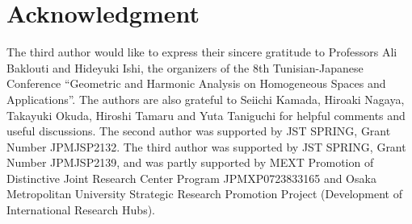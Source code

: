 \documentclass[dvipdfmx,12pt]{amsart}
\theoremstyle{plain}
\theoremstyle{definition}
\begin{document}
\section*{Acknowledgment}
The third author would like to express their sincere gratitude to Professors Ali Baklouti and Hideyuki Ishi, the organizers of the 8th Tunisian-Japanese Conference “Geometric and Harmonic Analysis on Homogeneous Spaces and Applications”.
The authors are also grateful
to Seiichi Kamada, Hiroaki Nagaya, Takayuki Okuda, Hiroshi Tamaru and Yuta Taniguchi for helpful comments and useful discussions.
The second author was supported by JST SPRING, Grant Number JPMJSP2132.
The third author was supported by JST SPRING, Grant Number JPMJSP2139,
and was partly supported by MEXT Promotion of Distinctive Joint Research Center Program JPMXP0723833165 and Osaka Metropolitan University Strategic Research Promotion Project (Development of International Research Hubs).



	
\end{document}
